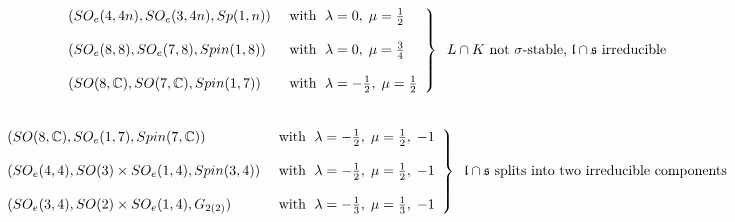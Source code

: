 \documentclass[10]{amsart}
\theoremstyle{remark}
\theoremstyle{definition}
\numberwithin{equation}{section}
\newcommand{\fl}{{\mathfrak l}}
\newcommand{\fs}{{\mathfrak s}}
\begin{document}
{ \begin{equation*}
 \left.
 \begin{array}{ll}
   (SO_e(4,4n),SO_e(3,4n),Sp(1,n)) & \text{ with }\; \lambda=0,\;\mu=\frac{1}{2}\\
     \\
     (SO_e(8,8),SO_e(7,8),Spin(1,8)) & \text{ with }\; \lambda=0,\;\mu=\frac{3}{4}\\
     \\
     (SO(8,{\mathbb C}),SO(7,{\mathbb C}),Spin(1,7))& \text{ with }\; \lambda=-\frac{1}{2},\;\mu=\frac{1}{2}
         \end{array}
   \right \}\hspace*{0.2cm}L\cap K\text{ not $\sigma$-stable, }\fl\cap\fs\text{ irreducible}
  \end{equation*}
%
\vspace*{0.1cm}\\
 \begin{equation*}
 \left.
 \begin{array}{ll}
  (SO(8,{\mathbb C}),SO_e(1,7),Spin(7,{\mathbb C})) & \text{ with }\; \lambda=-\frac{1}{2},\;\mu=\frac{1}{2},\;-1\\
  \\
   (SO_e(4,4),SO(3)\times SO_e(1,4),Spin(3,4)) & \text{ with }\; \lambda=-\frac{1}{2},\;\mu=\frac{1}{2},\;-1\\
    \\
     (SO_e(3,4),SO(2)\times SO_e(1,4),G_{2(2)}) & \text{ with }\; \lambda=-\frac{1}{3},\;\mu=\frac{1}{3},\;-1\\
       \end{array}
   \right \}\hspace*{0.2cm}\fl\cap\fs\text{ splits into two irreducible components}
  \end{equation*}
%
\vspace*{0.5cm}
%

}
\end{document}
